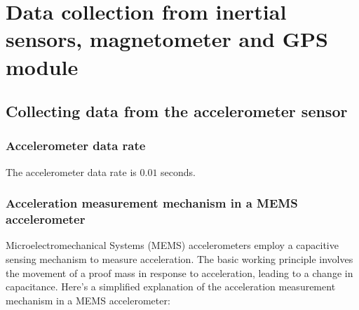 \section{Data collection from inertial sensors, magnetometer and GPS module}
\subsection{Collecting data from the accelerometer sensor}
\subsubsection{Accelerometer data rate}
The accelerometer data rate is $0.01$ seconds.
\subsubsection{Acceleration measurement mechanism in a MEMS accelerometer}
Microelectromechanical Systems (MEMS) accelerometers employ a capacitive sensing mechanism to measure acceleration. The basic working principle involves the movement of a proof mass in response to acceleration, leading to a change in capacitance. Here's a simplified explanation of the acceleration measurement mechanism in a MEMS accelerometer:

